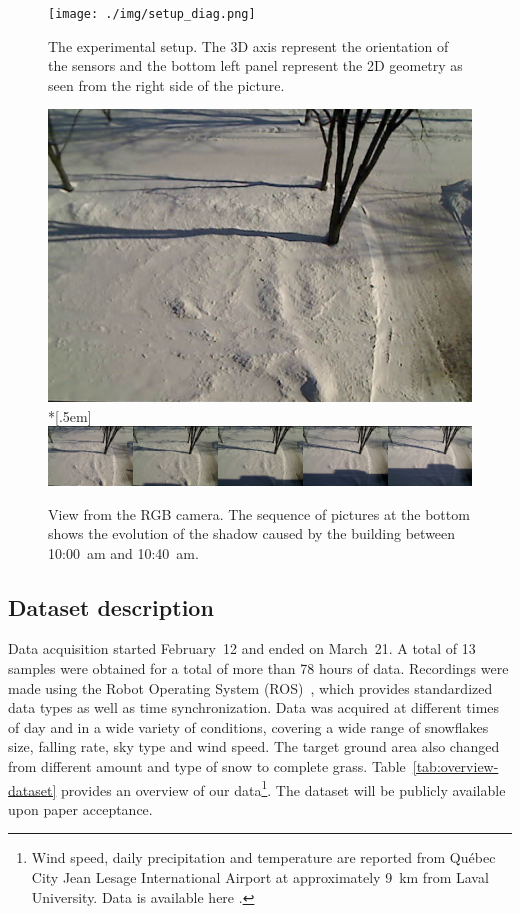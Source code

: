 \begin{figure}[th]
    \centering
    \texttt{[image: ./img/setup\_diag.png]}
    \caption{The experimental setup. The 3D axis represent the orientation of the sensors and the bottom left panel represent the 2D geometry as seen from the right side of the picture.}
    \label{fig:setup}
\end{figure}

\begin{figure}[th]
    \centering
    \includegraphics[width=0.90\linewidth]{./img/camera_view.jpg}\\*[.5em]
    \includegraphics[width=0.90\linewidth]{./img/shadow2.png}
    \caption{View from the RGB camera. The sequence of pictures at the bottom shows the evolution of the shadow caused by the building between 10:00~am and 10:40~am.}
    \label{fig:view}
\end{figure}

\subsection{Dataset description}
Data acquisition started February~12 and ended on March~21. A total of 13 samples were obtained for a total of more than 78 hours of data. Recordings were made using the Robot Operating System (ROS)~\cite{ROSWeb}, which provides standardized data types as well as time synchronization. Data was acquired at different times of day and in a wide variety of conditions, covering a wide range of snowflakes size, falling rate, sky type and wind speed. The target ground area also changed from different amount and type of snow to complete grass. Table~\ref{tab:overview-dataset} provides an overview of our data\footnote{Wind speed, daily precipitation and temperature are reported from Québec City Jean Lesage International Airport at approximately \SI{9}{\km} from Laval University. Data is available here \cite{WeatherCanada}.}. The dataset will be publicly available upon paper acceptance.

